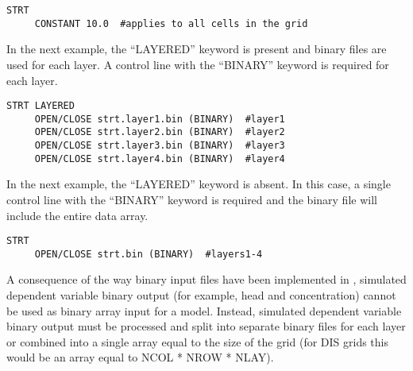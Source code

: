 \begin{lstlisting}[style=inputfile]
  STRT
     CONSTANT 10.0  #applies to all cells in the grid
\end{lstlisting}

In the next example, the ``LAYERED'' keyword is present and binary files are used for each layer. A control line with the ``BINARY'' keyword is required for each layer.

\begin{lstlisting}[style=inputfile]
  STRT LAYERED
     OPEN/CLOSE strt.layer1.bin (BINARY)  #layer1
     OPEN/CLOSE strt.layer2.bin (BINARY)  #layer2
     OPEN/CLOSE strt.layer3.bin (BINARY)  #layer3
     OPEN/CLOSE strt.layer4.bin (BINARY)  #layer4
\end{lstlisting}

In the next example, the ``LAYERED'' keyword is absent. In this case, a single control line with the ``BINARY'' keyword is required and the binary file will include the entire data array.

\begin{lstlisting}[style=inputfile]
  STRT
     OPEN/CLOSE strt.bin (BINARY)  #layers1-4
\end{lstlisting}

A consequence of the way binary input files have been implemented in \mf, simulated dependent variable binary output (for example, head and concentration) cannot be used as binary array input for a model. Instead, simulated dependent variable binary output must be processed and split into separate binary files for each layer or combined into a single array equal to the size of the grid (for DIS grids this would be an array equal to NCOL * NROW * NLAY).
